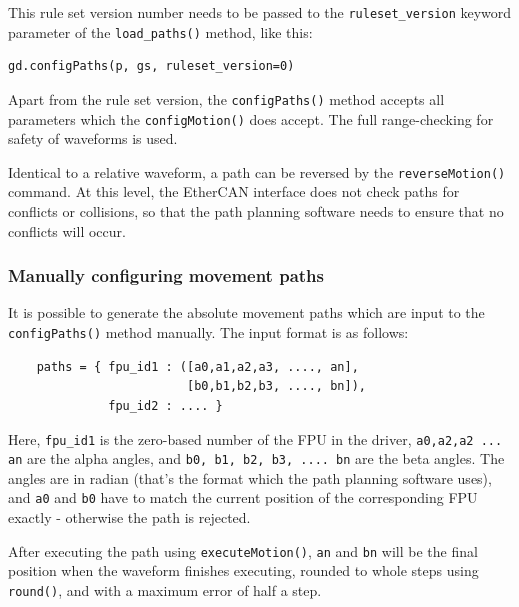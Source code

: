 \documentclass[11pt,a4paper]{scrartcl}
\begin{document}
%
%
This rule set version number needs to be passed to the
\texttt{ruleset\_version} keyword parameter of the
\texttt{load\_paths()} method, like this:


\begin{verbatim}
gd.configPaths(p, gs, ruleset_version=0)
\end{verbatim}

Apart from the rule set version, the \texttt{configPaths()} method
accepts all parameters which the \texttt{configMotion()} does accept.
The full range-checking for safety of waveforms is used.

Identical to a relative waveform, a path can be reversed by the
\texttt{reverseMotion()} command. At this level, the EtherCAN interface does not
check paths for conflicts or collisions, so that the path planning
software needs to ensure that no conflicts will occur.

\subsubsection{Manually configuring movement paths}
\label{sec:manuallyconfiguringpaths}%
%
%
%
%
It is possible to generate the absolute movement paths which are input
to the \texttt{configPaths()} method manually.  The input format is as
follows:

\begin{verbatim}
    paths = { fpu_id1 : ([a0,a1,a2,a3, ...., an],
                         [b0,b1,b2,b3, ...., bn]),
              fpu_id2 : .... }
\end{verbatim}

Here, \verb+fpu_id1+ is the zero-based number of the FPU in the
driver, \verb+a0,a2,a2 ... an+ are the alpha angles, and
\verb+b0, b1, b2, b3, .... bn+ are the beta angles. The angles are in
radian (that's the format which the path planning software uses), and
\verb+a0+ and \verb+b0+ have to match the current position of the
corresponding FPU exactly - otherwise the path is rejected.

After executing the path using \texttt{executeMotion()}, \verb+an+ and
\verb+bn+ will be the final position when the waveform finishes
executing, rounded to whole steps using \texttt{round()}, and with a
maximum error of half a step.
\end{document}
